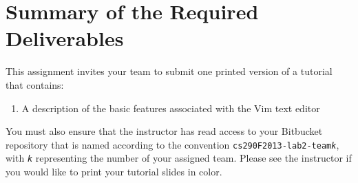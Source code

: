 \section*{Summary of the Required Deliverables}

This assignment invites your team to submit one printed version of a tutorial that contains:

\begin{enumerate}
	
	\item A description of the basic features associated with the Vim text editor

\end{enumerate}

You must also ensure that the instructor has read access to your Bitbucket repository that is named according to the
convention {\tt cs290F2013-lab2-team{\em k}}, with {\tt {\em k}} representing the number of your assigned team. Please
see the instructor if you would like to print your tutorial slides in color.


